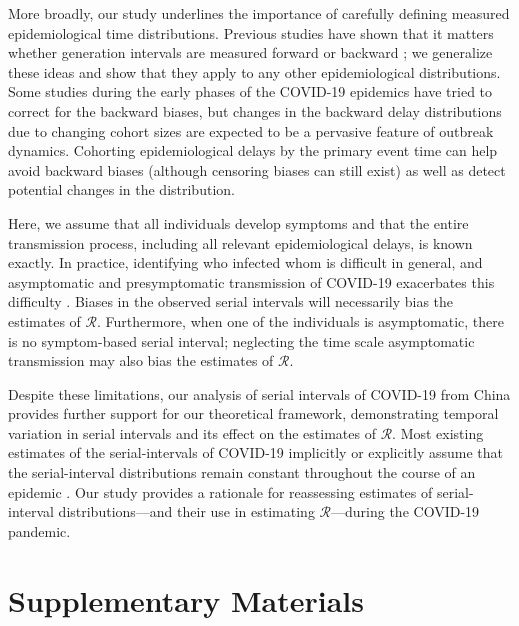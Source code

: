 \documentclass[12pt]{article}
\newcommand{\RR}{\ensuremath{{\mathcal R}}\xspace}
\begin{document}
More broadly, our study underlines the importance of carefully defining measured epidemiological time distributions. 
Previous studies have shown that it matters whether generation
intervals are measured forward or backward \citep{nishiura2010time,champredon2015intrinsic,britton2019estimation};
we generalize these ideas and show that they apply to any other epidemiological distributions.
Some studies during the early phases of the COVID-19 epidemics have tried to correct for the backward biases, but changes in the backward delay distributions due to changing cohort sizes are expected to be a pervasive feature of outbreak dynamics.
Cohorting epidemiological delays by the primary event time can help avoid backward biases (although censoring biases can still exist) as well as detect potential changes in the distribution.

Here, we assume that all individuals develop symptoms and that the entire transmission process, including all relevant epidemiological delays, is known exactly.
In practice, identifying who infected whom is difficult in general, and asymptomatic and presymptomatic transmission of COVID-19 exacerbates this difficulty \citep{bai2020presumed,he2020temporal,wei2020presymptomatic}.
Biases in the observed serial intervals will necessarily bias the estimates of \RR. 
Furthermore, when one of the individuals is asymptomatic, there is no symptom-based serial interval; 
neglecting the time scale asymptomatic transmission may also bias the estimates of \RR \citep{park2020time}.

Despite these limitations, our analysis of serial intervals of COVID-19 from China provides further support for our theoretical framework, demonstrating temporal variation in serial intervals and its effect on the estimates of \RR.
Most existing estimates of the serial-intervals of COVID-19 implicitly or explicitly assume that the serial-interval distributions remain constant throughout the course of an epidemic \citep{du2020serial, he2020temporal, nishiura2020serial,tindale2020transmission,zhao2020estimating,zhang2020evolving}.
Our study provides a rationale for reassessing estimates of
serial-interval distributions---and their use in estimating
\RR---during the COVID-19 pandemic.

\pagebreak

\section{Supplementary Materials}
\end{document}
